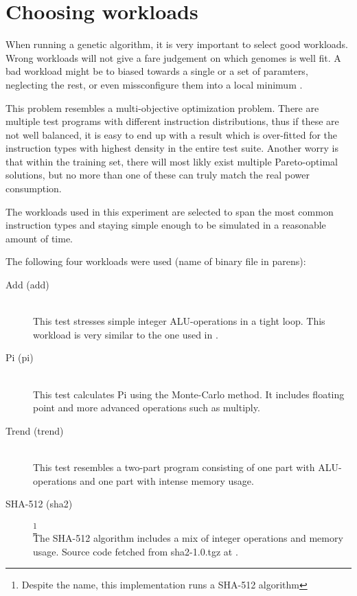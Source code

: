 \section{Choosing workloads}

When running a genetic algorithm, it is very important to select good workloads.
Wrong workloads will not give a fare judgement on which genomes is well fit. A
bad workload might be to biased towards a single or a set of paramters,
neglecting the rest, or even missconfigure them into a local minimum
\cite{magic-book-of-ga}.

This problem resembles a multi-objective optimization problem. There are
multiple test programs with different instruction distributions, thus if these
are not well balanced, it is easy to end up with a result which is over-fitted
for the instruction types with highest density in the entire test suite. Another
worry is that within the training set, there will most likly exist multiple
Pareto-optimal solutions\cite{deb2014multi}, but no more than one of these can
truly match the real power consumption.

The workloads used in this experiment are selected to span the most common
instruction types and staying simple enough to be simulated in a reasonable
amount of time.

The following four workloads were used (name of binary file in parens):
\begin{description}
    \item[Add (add)] \hfill \\
        This test stresses simple integer ALU-operations in a tight loop.
        This workload is very similar to the one used in \cite{rundehvatum2013exploring}.


    \item[Pi (pi)] \hfill \\
        This test calculates Pi using the Monte-Carlo method. It includes
        floating point and more advanced operations such as multiply.

    \item[Trend (trend)] \hfill \\
        This test resembles a two-part program consisting of
        one part with ALU-operations and one part with intense memory usage.

    \item[SHA-512 (sha2)]
        \footnote{Despite the name, this implementation runs a  SHA-512
        algorithm} \hfill \\
        The SHA-512 algorithm includes a mix of integer operations and
        memory usage. Source code fetched from sha2-1.0.tgz at \cite{sha2}.
\end{description}

